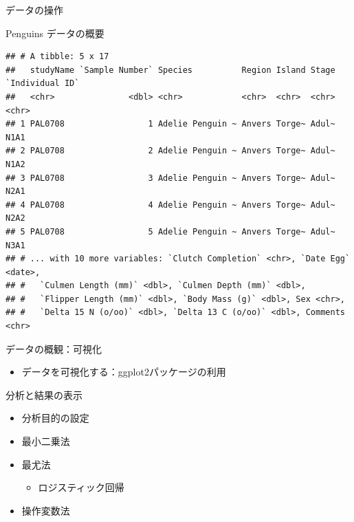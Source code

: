 \documentclass[
  ignorenonframetext,
]{beamer}
\providecommand{\tightlist}{%
  \setlength{\itemsep}{0pt}\setlength{\parskip}{0pt}}
\begin{document}
\begin{frame}[fragile]{データの操作}
\begin{block}{Penguins データの概要}
\begin{verbatim}
## # A tibble: 5 x 17
##   studyName `Sample Number` Species          Region Island Stage `Individual ID`
##   <chr>               <dbl> <chr>            <chr>  <chr>  <chr> <chr>          
## 1 PAL0708                 1 Adelie Penguin ~ Anvers Torge~ Adul~ N1A1           
## 2 PAL0708                 2 Adelie Penguin ~ Anvers Torge~ Adul~ N1A2           
## 3 PAL0708                 3 Adelie Penguin ~ Anvers Torge~ Adul~ N2A1           
## 4 PAL0708                 4 Adelie Penguin ~ Anvers Torge~ Adul~ N2A2           
## 5 PAL0708                 5 Adelie Penguin ~ Anvers Torge~ Adul~ N3A1           
## # ... with 10 more variables: `Clutch Completion` <chr>, `Date Egg` <date>,
## #   `Culmen Length (mm)` <dbl>, `Culmen Depth (mm)` <dbl>,
## #   `Flipper Length (mm)` <dbl>, `Body Mass (g)` <dbl>, Sex <chr>,
## #   `Delta 15 N (o/oo)` <dbl>, `Delta 13 C (o/oo)` <dbl>, Comments <chr>
\end{verbatim}
\end{block}
\end{frame}

\begin{frame}{データの概観：可視化}
\protect\hypertarget{ux30c7ux30fcux30bfux306eux6982ux89b3ux53efux8996ux5316}{}
\begin{itemize}
\tightlist
\item
  データを可視化する：ggplot2パッケージの利用
\end{itemize}
\end{frame}

\begin{frame}{分析と結果の表示}
\protect\hypertarget{ux5206ux6790ux3068ux7d50ux679cux306eux8868ux793a}{}
\begin{itemize}
\tightlist
\item
  分析目的の設定
\item
  最小二乗法
\item
  最尤法

  \begin{itemize}
  \tightlist
  \item
    ロジスティック回帰
  \end{itemize}
\item
  操作変数法
\end{itemize}
\end{frame}
\end{document}
